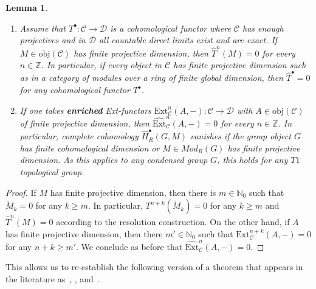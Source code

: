 \documentclass[12pt, a4paper]{article}
\numberwithin{equation}{section}
\newtheorem{lem}[thm]{Lemma}
\theoremstyle{empty}
\theoremstyle{nonumberplain}
\newtheorem{proof}{Proof}
\begin{document}
\begin{lem}\label{lem:prevanishing}
\begin{enumerate}
    \item Assume that $T^{\bullet}: \mathcal{C} \rightarrow \mathcal{D}$ is a cohomological functor where $\mathcal{C}$ has enough projectives and in $\mathcal{D}$ all countable direct limits exist and are exact. If $M \in \mathrm{obj}(\mathcal{C})$ has finite projective dimension, then $\widehat{T}^n(M) = 0$ for every $n \in \mathbb{Z}$. In particular, if every object in $\mathcal{C}$ has finite projective dimension such as in a category of modules over a ring of finite global dimension, then $\widehat{T}^{\bullet} = 0$ for any cohomological functor $T^{\bullet}$.
    \item If one takes \textbf{enriched} Ext-functors $\mathrm{Ext}_{\mathcal{C}}^n(A, -): \mathcal{C} \rightarrow \mathcal{D}$ with $A \in \mathrm{obj}(\mathcal{C})$ of finite projective dimension, then $\widehat{\mathrm{Ext}}_{\mathcal{C}}^n(A, -) = 0$ for every $n \in \mathbb{Z}$. In particular, complete cohomology $\widehat{H}_R^{\bullet}(G, M)$ vanishes if the group object $G$ has finite cohomological dimension or $M \in Mod_R(G)$ has finite projective dimension. As this applies to any condensed group $G$, this holds for any $T1$ topological group.
\end{enumerate}
\end{lem}

\begin{proof}
If $M$ has finite projective dimension, then there is $m \in \mathbb{N}_0$ such that $\widetilde{M}_k = 0$ for any $k \geq m$. In particular, $T^{n+k}(\widetilde{M}_k) = 0$ for any $k \geq m$ and $\widehat{T}^n(M) = 0$ according to the resolution construction. On the other hand, if $A$ has finite projective dimension, then there $m' \in \mathbb{N}_0$ such that $\mathrm{Ext}_{\mathcal{C}}^{n+k}(A, -) = 0$ for any $n+k \geq m'$. We conclude as before that $\widehat{\mathrm{Ext}}_{\mathcal{C}}^n(A, -) = 0$.
\end{proof}

This allows us to re-establish the following version of a theorem that appears in the literature as~\cite[Proposition~IX.1.3]{bel07}, \cite[Theorem~4.11]{guo23}, \cite[Theorem~3.10]{hu21} and~\cite[Lemma~4.2.4]{kro95}.
\end{document}
